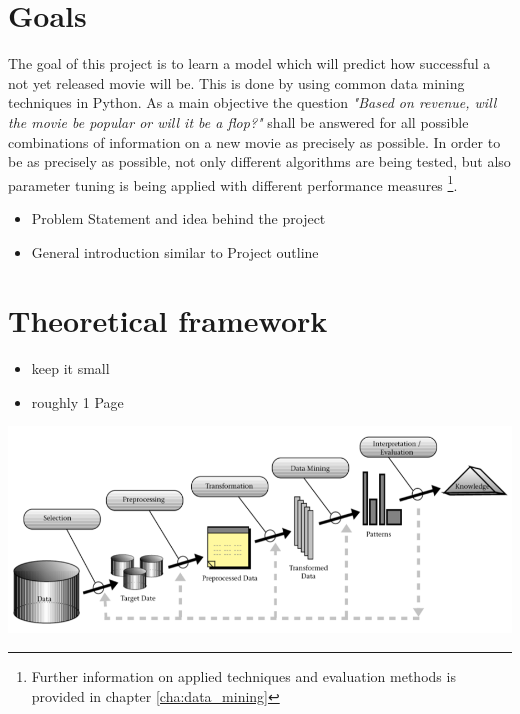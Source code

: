 \section{Goals}
The goal of this project is to learn a model which will predict how successful a not yet released movie will be. This is done by using common data mining techniques in Python. As a main objective the question \textit{"Based on revenue, will the movie be popular or will it be a flop?"} shall be answered for all possible combinations of information on a new movie as precisely as possible.
In order to be as precisely as possible, not only different algorithms are being tested, but also parameter tuning is being applied with different performance measures \footnote{Further information on applied techniques and evaluation methods is provided in chapter \ref{cha:data_mining}}.


\begin{itemize}
	\item Problem Statement and idea behind the project
	\item General introduction similar to Project outline
\end{itemize}

\section{Theoretical framework}
\begin{itemize}
	\item keep it small
	\item roughly 1 Page
\end{itemize}
\includegraphics[width=\textwidth]{images/DM_Process.png}









